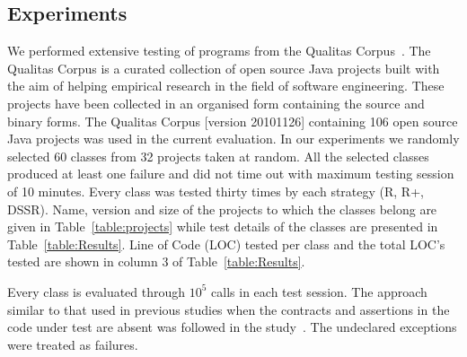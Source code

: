 \subsection{Experiments}
We performed extensive testing of programs from the Qualitas Corpus~\cite{tempero2010empirical}. The Qualitas Corpus is a curated collection of open source Java projects built with the aim of helping empirical research in the field of software engineering. These projects have been collected in an organised form containing the source and binary forms. The Qualitas Corpus [version 20101126] containing 106 open source Java projects was used in the current evaluation. In our experiments we randomly selected 60 classes from 32 projects taken at random. All the selected classes produced at least one failure and did not time out with maximum testing session of 10 minutes. Every class was tested thirty times by each strategy (R, R+, DSSR). Name, version and size of the projects to which the classes belong are given in Table~\ref{table:projects} while test details of the classes are presented in Table~\ref{table:Results}. Line of Code (LOC) tested per class and the total LOC's tested are shown in column 3 of Table~\ref{table:Results}. 

Every class is evaluated through $10^5$ calls in each test session. %
The approach similar to that used in previous studies when the contracts and assertions in the code under test are absent was followed in the study~\cite{oriol2012random}. The undeclared exceptions were treated as failures.


